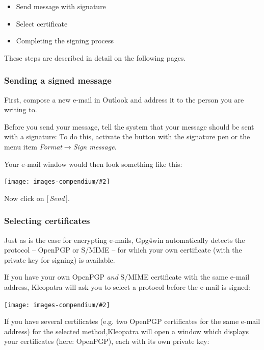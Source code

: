 \documentclass[a4paper,11pt,oneside,openright,titlepage]{scrbook}
\newcommand{\Button}[1]{[\,\textit{#1}\,]}
\newcommand{\Menu}[1]{\textit{#1}}
\newcommand{\Email}{e-mail}
\newcommand{\IncludeImage}[2][]{
\begin{center}
  \texttt{[image: images-compendium/\#2]}%
\end{center}
}
\begin{document}
\begin{itemize}
    \item Send message with signature

    \item Select certificate

    \item Completing the signing process
\end{itemize}

These steps are described in detail on the following pages.

\subsubsection{Sending a signed message}

First, compose a new \Email{} in Outlook and address it to the person
you are writing to.

Before you send your message, tell the system that your message should
be sent with a signature: To do this, activate the button with the
signature pen or the menu item \Menu{Format$\rightarrow$Sign message}.

Your \Email{} window would then look something like this:

\IncludeImage[width=0.85\textwidth]{sc-ol-sendSignedMail_en}

Now click on \Button{Send}.

\clearpage
\subsubsection{Selecting certificates}

Just as is the case for encrypting \Email{}s, Gpg4win automatically
detects the protocol -- OpenPGP or S/MIME -- for which your own
certificate (with the private key for signing) is available.

If you have your own OpenPGP \textit{and} S/MIME certificate with the
same \Email{} address, Kleopatra will ask you to select a protocol
before the \Email{} is signed:

\IncludeImage[width=0.45\textwidth]{sc-kleopatra-format-choice_de}

If you have several certificates (e.g. two OpenPGP certificates for
the same \Email{} address) for the selected method,Kleopatra will open
a window which displays your certificates (here: OpenPGP), each with
its own private key:
\end{document}
